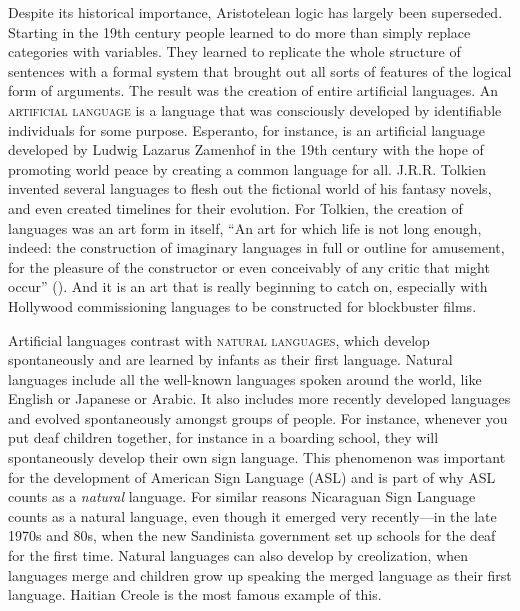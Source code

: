 Despite its historical importance, Aristotelean logic has largely been superseded. Starting in the 19th century people learned to do more than simply replace categories with variables. They learned to replicate the whole structure of sentences with a formal system that brought out all sorts of features of the logical form of arguments. The result was the creation of entire artificial languages. An \textsc{\gls{artificial language}} \label{def:artificial_language} is a language that was consciously developed by identifiable individuals for some purpose. Esperanto, for instance, is an artificial language developed by Ludwig Lazarus Zamenhof in the 19th century with the hope of promoting world peace by creating a common language for all. J.R.R. Tolkien invented several languages to flesh out the fictional world of his fantasy novels, and even created timelines for their evolution. For Tolkien, the creation of languages was an art form in itself, ``An art for which life is not long enough, indeed: the construction of imaginary languages in full or outline for amusement, for the pleasure of the constructor or even conceivably of any critic that might occur'' (\cite*{Tolkien1931}). And it is an art that is really beginning to catch on, especially with Hollywood commissioning languages to be constructed for blockbuster films. 

Artificial languages contrast with \textsc{\glspl{natural language}}, \label{def:natural_language} which develop spontaneously and are learned by infants as their first language. Natural languages include all the well-known languages spoken around the world, like English or Japanese or Arabic. It also includes more recently developed languages and evolved spontaneously amongst groups of people. For instance, whenever you put deaf children together, for instance in a boarding school, they will spontaneously develop their own sign language. This phenomenon was important for the development of American Sign Language (ASL) and is part of why ASL counts as a \textit{natural} language. For similar reasons Nicaraguan Sign Language counts as a natural language, even though it emerged very recently---in the late 1970s and 80s, when the new Sandinista government set up schools for the deaf for the first time. Natural languages can also develop by creolization, when languages merge and children grow up speaking the merged language as their first language. Haitian Creole is the most famous example of this.   

